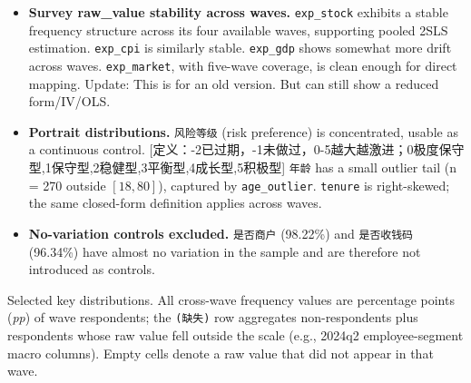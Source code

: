 \documentclass[11pt,letterpaper,english,final]{article}
\begin{document}
\begin{itemize}
\item \textbf{Survey raw\_value stability across waves.} \texttt{exp\_stock} exhibits a stable frequency structure across its four available waves, supporting pooled 2SLS estimation. \texttt{exp\_cpi} is similarly stable. \texttt{exp\_gdp} shows somewhat more drift across waves. \texttt{exp\_market}, with five-wave coverage, is clean enough for direct mapping. {\color{cyan}Update: This is for an old version. But can still show a reduced form/IV/OLS.}

\item \textbf{Portrait distributions.} \texttt{风险等级} (risk preference) is concentrated, usable as a continuous control. {\color{cyan}[定义：-2已过期，-1未做过，0-5越大越激进；0极度保守型,1保守型,2稳健型,3平衡型,4成长型,5积极型]} \texttt{年龄} has a small outlier tail (n = 270 outside $[18, 80]$), captured by \texttt{age\_outlier}. \texttt{tenure} is right-skewed; the same closed-form definition applies across waves.

\item \textbf{No-variation controls excluded.} \texttt{是否商户} (98.22\%) and \texttt{是否收钱码} (96.34\%) have almost no variation in the sample and are therefore not introduced as controls.
\end{itemize}

Selected key distributions. All cross-wave frequency values are percentage points (\textit{pp}) of wave respondents; the \texttt{(缺失)} row aggregates non-respondents plus respondents whose raw value fell outside the scale (e.g., 2024q2 employee-segment macro columns). Empty cells denote a raw value that did not appear in that wave.

\newpage
\end{document}
